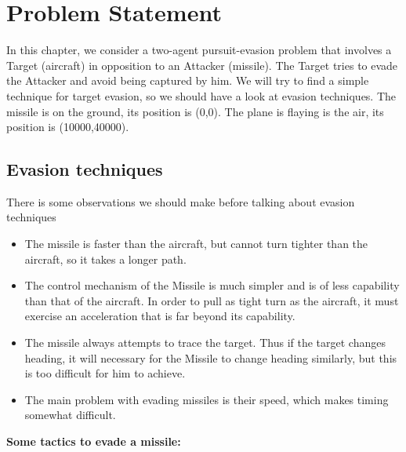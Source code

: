\section{Problem Statement}
In this chapter, we consider a two-agent pursuit-evasion problem that involves  a Target (aircraft) in opposition to an Attacker (missile). The Target tries to evade the Attacker and avoid being captured by him. We will try to find a simple technique for target evasion, so we should have a look at evasion techniques.
The missile is on the ground, its position is (0,0). The plane is flaying is the air, its position is (10000,40000).

\subsection{Evasion techniques}
There is some observations we should make before talking about evasion techniques 
\begin{itemize}
	\item The missile is faster than the aircraft, but cannot turn tighter than the aircraft, so it takes a longer path.
	\item The control mechanism of the Missile is much simpler and is of less capability than that of the aircraft. In order to pull as tight turn as the aircraft, it must exercise an acceleration that is far beyond its capability.
	\item The missile always attempts to trace the target. Thus if the target changes heading, it will necessary for the Missile to change heading similarly, but this is too difficult for him to achieve.
	\item  The main problem with evading missiles is their speed, which makes timing somewhat difficult.
\end{itemize}
\textbf{Some tactics to evade a missile:}
